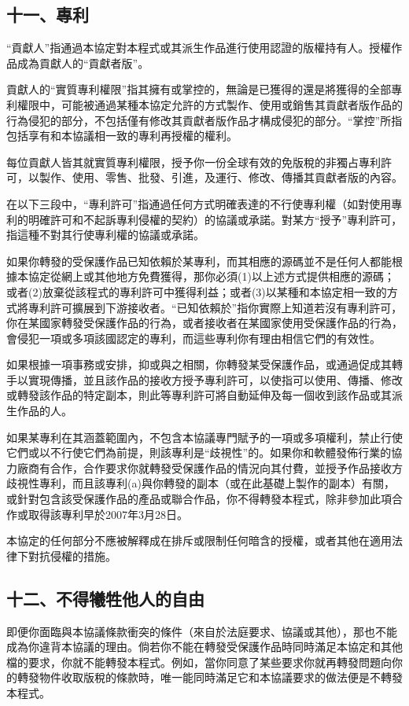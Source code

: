 \subsection{十一、專利}
“貢獻人”指通過本協定對本程式或其派生作品進行使用認證的版權持有人。授權作品成為貢獻人的“貢獻者版”。\par
貢獻人的“實質專利權限”指其擁有或掌控的，無論是已獲得的還是將獲得的全部專利權限中，可能被通過某種本協定允許的方式製作、使用或銷售其貢獻者版作品的行為侵犯的部分，不包括僅有修改其貢獻者版作品才構成侵犯的部分。“掌控”所指包括享有和本協議相一致的專利再授權的權利。\par
每位貢獻人皆其就實質專利權限，授予你一份全球有效的免版稅的非獨占專利許可，以製作、使用、零售、批發、引進，及運行、修改、傳播其貢獻者版的內容。\par
在以下三段中，“專利許可”指通過任何方式明確表達的不行使專利權（如對使用專利的明確許可和不起訴專利侵權的契約）的協議或承諾。對某方“授予”專利許可，指這種不對其行使專利權的協議或承諾。\par
如果你轉發的受保護作品已知依賴於某專利，而其相應的源碼並不是任何人都能根據本協定從網上或其他地方免費獲得，那你必須(1)以上述方式提供相應的源碼；或者(2)放棄從該程式的專利許可中獲得利益；或者(3)以某種和本協定相一致的方式將專利許可擴展到下游接收者。“已知依賴於”指你實際上知道若沒有專利許可，你在某國家轉發受保護作品的行為，或者接收者在某國家使用受保護作品的行為，會侵犯一項或多項該國認定的專利，而這些專利你有理由相信它們的有效性。\par
如果根據一項事務或安排，抑或與之相關，你轉發某受保護作品，或通過促成其轉手以實現傳播，並且該作品的接收方授予專利許可，以使指可以使用、傳播、修改或轉發該作品的特定副本，則此等專利許可將自動延伸及每一個收到該作品或其派生作品的人。\par
如果某專利在其涵蓋範圍內，不包含本協議專門賦予的一項或多項權利，禁止行使它們或以不行使它們為前提，則該專利是“歧視性”的。如果你和軟體發佈行業的協力廠商有合作，合作要求你就轉發受保護作品的情況向其付費，並授予作品接收方歧視性專利，而且該專利(a)與你轉發的副本（或在此基礎上製作的副本）有關，或針對包含該受保護作品的產品或聯合作品，你不得轉發本程式，除非參加此項合作或取得該專利早於2007年3月28日。\par
本協定的任何部分不應被解釋成在排斥或限制任何暗含的授權，或者其他在適用法律下對抗侵權的措施。
\subsection{十二、不得犧牲他人的自由}
即便你面臨與本協議條款衝突的條件（來自於法庭要求、協議或其他），那也不能成為你違背本協議的理由。倘若你不能在轉發受保護作品時同時滿足本協定和其他檔的要求，你就不能轉發本程式。例如，當你同意了某些要求你就再轉發問題向你的轉發物件收取版稅的條款時，唯一能同時滿足它和本協議要求的做法便是不轉發本程式。
